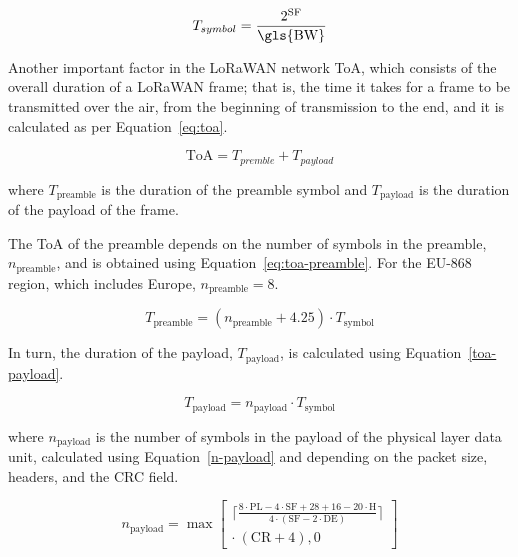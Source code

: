 \documentclass[a4paper,fleqn]{cas-dc}
\begin{document}
\begin{equation} \label{eq:t-symbol}
    T_{symbol} = \frac {2^{\text{SF}}} {\text{\gls{BW}}}
\end{equation}

Another important factor in the \gls{LoRaWAN} network \gls{ToA}, which consists of the overall duration of a \gls{LoRaWAN} frame; that is, the time it takes for a frame to be transmitted over the air, from the beginning of transmission to the end, and it is calculated as per Equation~\ref{eq:toa}.

\begin{equation} \label{eq:toa}
    \text{ToA} = T_{premble} + T_{payload}
\end{equation}

\noindent where \( T_{\text{preamble}} \) is the duration of the preamble symbol and \( T_{\text{payload}} \) is the duration of the payload of the frame.

The \gls{ToA} of the preamble depends on the number of symbols in the preamble, \( n_{\text{preamble}} \), and is obtained using Equation~\ref{eq:toa-preamble}. For the EU-868 region, which includes Europe, \( n_{\text{preamble}} = 8 \).

\begin{equation} \label{eq:toa-preamble}
    T_{\text{preamble}} = \left( n_{\text{preamble}} + 4.25 \right) \cdot T_{\text{symbol}}
\end{equation}

In turn, the duration of the payload, \( T_{\text{payload}} \), is calculated using Equation~\ref{toa-payload}.

\begin{equation} \label{toa-payload}
    T_{\text{payload}} = n_{\text{payload}} \cdot T_{\text{symbol}}
\end{equation}

\noindent where \( n_{\text{payload}} \) is the number of symbols in the payload of the physical layer data unit, calculated using Equation~\ref{n-payload} and depending on the packet size, headers, and the CRC field.

\begin{equation} \label{n-payload}
    n_{\text{payload}} = \max \left[ 
    \begin{split}
        \lceil \frac{8 \cdot \text{PL} - 4 \cdot \text{SF} + 28 + 16 - 20 \cdot \text{H}}{4 \cdot (\text{SF} - 2 \cdot \text{DE})} \rceil \\
        \cdot~(\text{CR} + 4), 0 
    \end{split}
    \right]
\end{equation}
\end{document}
